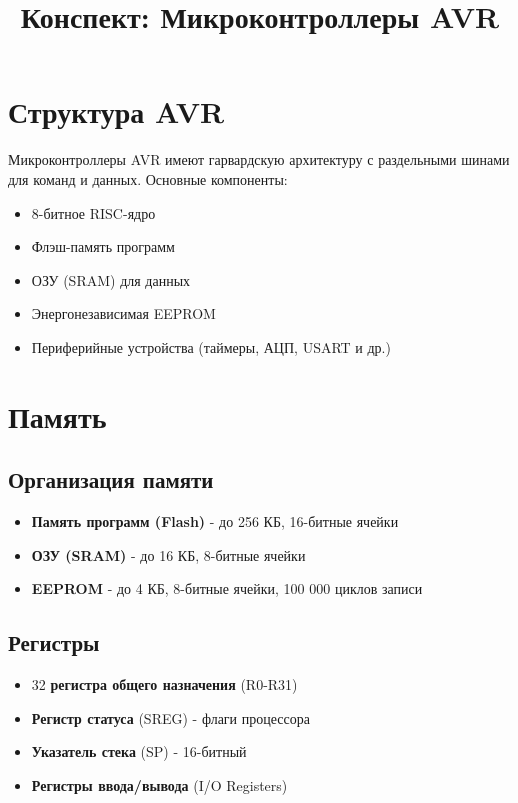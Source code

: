 \documentclass[a4paper,12pt]{article}
\title{Конспект: Микроконтроллеры AVR}
\author{}
\date{}
\begin{document}
\maketitle

\section{Структура AVR}
Микроконтроллеры AVR имеют гарвардскую архитектуру с раздельными шинами для команд и данных. Основные компоненты:
\begin{itemize}
    \item 8-битное RISC-ядро
    \item Флэш-память программ
    \item ОЗУ (SRAM) для данных
    \item Энергонезависимая EEPROM
    \item Периферийные устройства (таймеры, АЦП, USART и др.)
\end{itemize}

\section{Память}
\subsection{Организация памяти}
\begin{itemize}
    \item \textbf{Память программ (Flash)} - до 256 КБ, 16-битные ячейки
    \item \textbf{ОЗУ (SRAM)} - до 16 КБ, 8-битные ячейки
    \item \textbf{EEPROM} - до 4 КБ, 8-битные ячейки, 100 000 циклов записи
\end{itemize}

\subsection{Регистры}
\begin{itemize}
    \item 32 \textbf{регистра общего назначения} (R0-R31)
    \item \textbf{Регистр статуса} (SREG) - флаги процессора
    \item \textbf{Указатель стека} (SP) - 16-битный
    \item \textbf{Регистры ввода/вывода} (I/O Registers)
\end{itemize}
\end{document}
